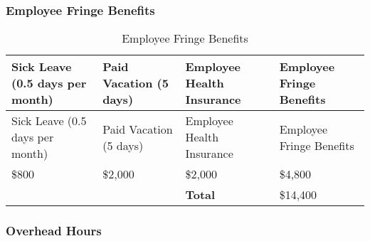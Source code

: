 \subsubsection{Employee Fringe Benefits}
\begin{center}
\setlength{\extrarowheight}{1.5pt}
  \begin{longtable}{|p{3cm}|p{3cm}|p{3cm}|p{3cm}|}
 \caption{Employee Fringe Benefits} \\
   \hline
  
  \centering Sick Leave (0.5 days per month) & Paid Vacation (5 days) & Employee Health Insurance & Employee Fringe Benefits \\
  \hline \hline \endfirsthead
  
     \hline

	\centering Sick Leave (0.5 days per month) & Paid Vacation (5 days) & Employee Health Insurance & Employee Fringe Benefits \\
	\hline \hline \endhead
  
  \endfoot  

    \$800 & \$2,000 & \$2,000 & \$4,800  \\ \hline
    \multicolumn{1}{l}{}      & \multicolumn{1}{l}{}      & \multicolumn{1}{l}{\textbf{Total}} & \multicolumn{1}{l}{\$14,400}  \\
          
           \end{longtable}
\end{center}

\subsubsection{Overhead Hours}

